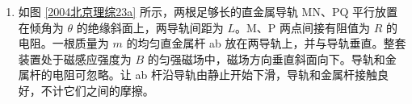 \documentclass[\gkver]{gaokaozhenti}
\begin{document}
\begin{enumerate}
\begin{enumerate}
	\item
	连接好电路，将开关 S$_{2}$ 扳到接点 b 处，接通开关 S$_{1}$，调整滑动变阻器 $R_{2}$ 使电流表 A$_{2}$ 的读数是 $150\UmuA$；然后将开关 S$_{2}$ 扳到接点 a 处，保持 $R_{2}$ 不变，调节电阻箱 $R_{1}$，使 A$_{2}$ 的读数仍为 $150\UmuA$。若此时电阻箱各旋钮的位置如图 \ref{2004北京理综22c} 所示，电阻箱 $R_{1}$ 的阻值是  $\UO$，则待测电流表 A$_{1}$ 的内阻 $R_{g}=$  $\UO$。

	\item
	上述实验中，无论怎样调整滑动变阻器 $R_{2}$ 的滑动端位置，都要保证两块电流表的安全。在下面提供的四个电阻中，保护电阻 $R_{3}$ 应选用：（填写阻值相应的字母）。

	（A）$200\UkO$　　（B）$20\UkO$　　（C）$15\UkO$　　（D）$20\UO$
	\item
	下面提供最大阻值不同的四个滑动变阻器供选用。既要满足上述实验要求，又要调整方便，滑动变阻器 （填写阻值相应的字母）是最佳选择。

	（A）$1\UkO$　　（B）$5\UkO$　　（C）$10\UkO$　　（D）$25\UkO$
\end{enumerate}

\item
如图 \ref{2004北京理综23a} 所示，两根足够长的直金属导轨 MN、PQ 平行放置在倾角为 $\theta$ 的绝缘斜面上，两导轨间距为 $L$。M、P 两点间接有阻值为 $R$ 的电阻。一根质量为 $m$ 的均匀直金属杆 ab 放在两导轨上，并与导轨垂直。整套装置处于磁感应强度为 $B$ 的匀强磁场中，磁场方向垂直斜面向下。导轨和金属杆的电阻可忽略。让 ab 杆沿导轨由静止开始下滑，导轨和金属杆接触良好，不计它们之间的摩擦。


\end{enumerate}
\end{document}
